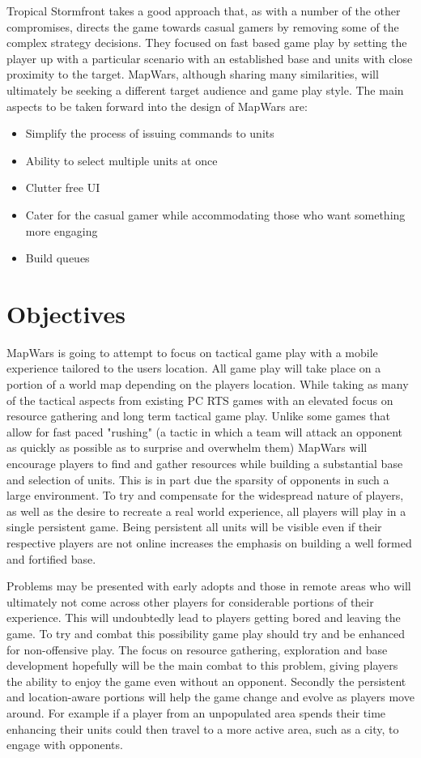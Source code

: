 Tropical Stormfront takes a good approach that, as with a number of the other compromises, directs the game towards casual gamers by removing some of the complex strategy decisions. They focused on fast based game play by setting the player up with a particular scenario with an established base and units with close proximity to the target. MapWars, although sharing many similarities, will ultimately be seeking a different target audience and game play style. The main aspects to be taken forward into the design of MapWars are:
\begin{itemize}
\item Simplify the process of issuing commands to units
\item Ability to select multiple units at once
\item Clutter free UI
\item Cater for the casual gamer while accommodating those who want something more engaging
\item Build queues
\end{itemize}


\section{Objectives}
MapWars is going to attempt to focus on tactical game play with a mobile experience tailored to the users location. All game play will take place on a portion of a world map depending on the players location. While taking as many of the tactical aspects from existing PC RTS games with an elevated focus on resource gathering and long term tactical game play. Unlike some games that allow for fast paced "rushing" (a tactic in which a team will attack an opponent as quickly as possible as to surprise and overwhelm them) MapWars will encourage players to find and gather resources while building a substantial base and selection of units. This is in part due the sparsity of opponents in such a large environment. To try and compensate for the widespread nature of players, as well as the desire to recreate a real world experience, all players will play in a single persistent game. Being persistent all units will be visible even if their respective players are not online increases the emphasis on building a well formed and fortified base.

Problems may be presented with early adopts and those in remote areas who will ultimately not come across other players for considerable portions of their experience. This will undoubtedly lead to players getting bored and leaving the game. To try and combat this possibility game play should try and be enhanced for non-offensive play. The focus on resource gathering, exploration and base development hopefully will be the main combat to this problem, giving players the ability to enjoy the game even without an opponent. Secondly the persistent and location-aware portions will help the game change and evolve as players move around. For example if a player from an unpopulated area spends their time enhancing their units could then travel to a more active area, such as a city, to engage with opponents.

